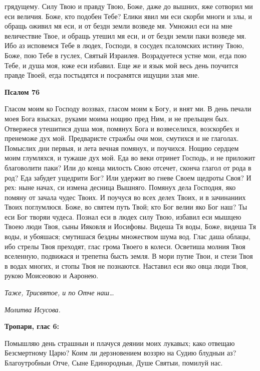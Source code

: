 грядущему. Силу Твою и правду Твою, Боже, даже до вышних, яже
сотворил ми еси величия. Боже, кто подобен Тебе? Елики явил ми
еси скорби многи и злы, и обращь оживил мя еси, и от бездн земли
возведе мя. Умножил еси на мне величествие Твое, и обращь утешил
мя еси, и от бездн земли паки возведе мя. Ибо аз исповемся Тебе
в людех, Господи, в сосудех псаломских истину Твою, Боже, пою
Тебе в гуслех, Святый Израилев. Возрадуетеся устне мои, егда пою
Тебе, и душа моя, юже еси избавил. Еще же и язык мой весь день
поучится правде Твоей, егда постыдятся и посрамятся ищущии злая
мне.



 

\bfseries Псалом 76\normalfont{}


   Гласом моим ко Господу воззвах, гласом моим к Богу, и внят
ми. В день печали моея Бога взысках, руками моима нощию пред
Ним, и не прельщен бых. Отвержеся утешитися душа моя, помянух
Бога и возвеселихся, возскорбех и пренеможе дух мой. Предваристе
стражбы очи мои, смутихся и не глаголах. Помыслих дни первыя, и
лета вечная помянух, и поучихся. Нощию сердцем моим глумляхся,
и тужаше дух мой. Еда во веки отринет Господь, и не приложит
благоволити паки? Или до конца милость Свою отсечет, сконча глагол от
рода в род? Еда забудет ущедрити Бог? Или удержит во гневе Своем
щедроты Своя? И рех: ныне начах, си измена десница Вышняго. Помянух
дела Господня, яко помяну от зачала чудес Твоих. И поучуся во всех
делех Твоих, и в зачинаниих Твоих поглумлюся. Боже, во святем
путь Твой; кто Бог велии яко Бог наш? Ты еси Бог творяи чудеса.
Познал еси в людех силу Твою, избавил еси мышцею Твоею люди
Твоя, сыны Ияковля и Иосифовы. Видеша Тя воды, Боже, видеша Тя
воды, и убояшася; смутишася бездны множеством шума вод. Глас
даша облацы, ибо стрелы Твоя преходят, глас грома Твоего в колеси.
Осветиша молния Твоя вселенную, подвижася и трепетна бысть земля.
В мори путие Твои, и стези Твоя в водах многих, и стопы Твоя не
познаются. Наставил еси яко овца люди Твоя, рукою Моисеовою и
Ааронею.


 \itshape Таже,\normalfont{} \itshape Трисвятое\normalfont{}, \itshape и по\normalfont{} Отче наш…


 \itshape Молитва Исусова.\normalfont{}



 

\bfseries Тропари, глас 6:\normalfont{}


   Помышляю день страшныи и плачуся деянии моих лукавых; како
отвещаю Безсмертному Царю? Коим ли дерзновением воззрю на Судию
блудныи аз? Благоутробныи Отче, Сыне Единородныи, Душе Святыи,
помилуй нас.


